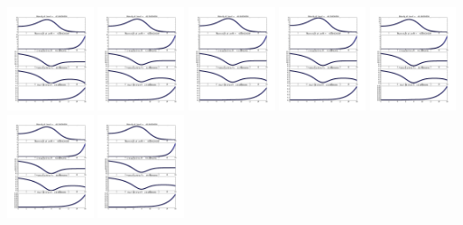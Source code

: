 \documentclass[11pt]{article}
\begin{document}
\vskip 10pt 
\includegraphics[width=0.19\textwidth]{frame0027fig1.png}
\vskip 10pt 
\includegraphics[width=0.19\textwidth]{frame0028fig1.png}
\vskip 10pt 
\includegraphics[width=0.19\textwidth]{frame0029fig1.png}
\vskip 10pt 
\includegraphics[width=0.19\textwidth]{frame0030fig1.png}
\vskip 10pt 
\includegraphics[width=0.19\textwidth]{frame0031fig1.png}
\vskip 10pt 
\includegraphics[width=0.19\textwidth]{frame0032fig1.png}
\vskip 10pt 
\includegraphics[width=0.19\textwidth]{frame0033fig1.png}
\end{document}
